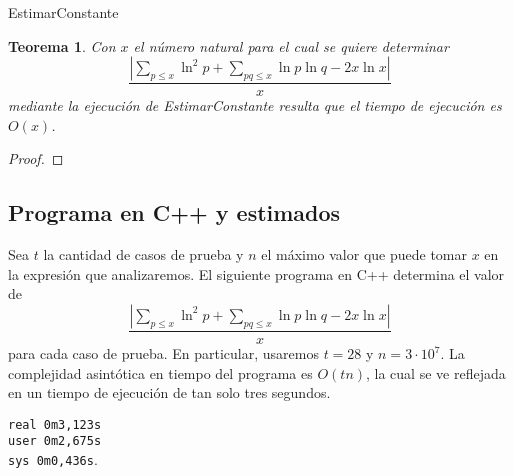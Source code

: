 \documentclass[10pt]{article}
\newcommand\cppfile[2][]{}
\newtheorem{theorem}{Teorema}
\theoremstyle{definition}
\theoremstyle{remark}
\begin{document}
\begin{algorithm}[H]
\SetAlgoLined
\DontPrintSemicolon
{}
\caption{EstimarConstante}
\end{algorithm}

\begin{theorem}
Con $x$ el n\'umero natural para el cual se quiere determinar
$$\frac{|\sum_{p \leq x} \ln^2 p + \sum_{pq \leq x} \ln p \ln q - 2x\ln x|}{x}$$
mediante la ejecuci\'on de EstimarConstante
resulta que el tiempo de ejecuci\'on es $O(x)$.
\end{theorem}

\begin{proof}
\end{proof}

\subsection{Programa en C++ y estimados}

Sea $t$ la cantidad de casos de prueba y $n$ el m\'aximo valor que puede tomar $x$ en la expresi\'on que analizaremos. 
El siguiente programa en C++ determina el valor de 
$$\frac{|\sum_{p \leq x} \ln^2 p + \sum_{pq \leq x} \ln p \ln q - 2x\ln x|}{x}$$
para cada caso de prueba.
En particular, usaremos $t = 28$ y $n = 3 \cdot 10^7$.
La complejidad asint\'otica en tiempo del programa es $O(tn)$, la cual se ve reflejada en un tiempo de ejecuci\'on
de tan solo tres segundos.

\begin{center}
    \texttt{real	0m3,123s}\\
    \texttt{user	0m2,675s}\\
    \texttt{sys	0m0,436s}.
\end{center}

\end{document}

